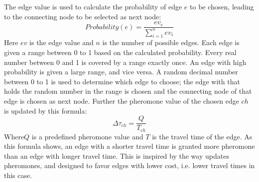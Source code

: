 The edge value is used to calculate the probability of edge $e$ to be chosen, leading to the connecting node to be selected as next node: 
\newline
$$Probability(e) = \frac{ev_e}{\sum\limits^{n}_{i=1}ev_i}$$
\newline
Here $ev$ is the edge value and $n$ is the number of possible edges. Each edge is given a range between 0 to 1 based on the calculated probability. Every real number between 0 and 1 is covered by a range exactly once. An edge with high probability is given a large range, and vice versa. A random decimal number between 0 to 1 is used to determine which edge to choose; the edge with that holds the random number in the range is chosen and the connecting node of that edge is chosen as next node. Further the pheromone value of the chosen edge $ch$ is updated by this formula:
\newline
$$\Delta \tau_{ch} = \frac{Q}{T_{ch}}$$ 
\newline
Where$Q$ is a predefined pheromone value and $T$ is the travel time of the edge. As this formula shows, an edge with a shorter travel time is granted more pheromone than an edge with longer travel time. This is inspired by the way \citet{hsiao04} updates pheromones, and designed to favor edges with lower cost, i.e. lower travel times in this case. 